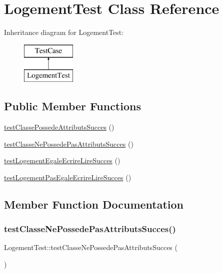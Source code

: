 \hypertarget{class_logement_test}{}\section{Logement\+Test Class Reference}
\label{class_logement_test}
Inheritance diagram for Logement\+Test\+:\begin{figure}[H]
\begin{center}
\leavevmode
\includegraphics[height=2.000000cm]{class_logement_test}
\end{center}
\end{figure}
\subsection*{Public Member Functions}
\begin{DoxyCompactItemize}
\item 
\hyperlink{class_logement_test_acea05fbf0c7cd9753be6445eebf78bd2}{test\+Classe\+Possede\+Attributs\+Succes} ()
\item 
\hyperlink{class_logement_test_a0ce0697b45827633d55c0e295f98761b}{test\+Classe\+Ne\+Possede\+Pas\+Attributs\+Succes} ()
\item 
\hyperlink{class_logement_test_af0b1e4628835aae912f751a7a6c90004}{test\+Logement\+Egale\+Ecrire\+Lire\+Succes} ()
\item 
\hyperlink{class_logement_test_a02f0a76289821a3e8f25fe930491c6ec}{test\+Logement\+Pas\+Egale\+Ecrire\+Lire\+Succes} ()
\end{DoxyCompactItemize}


\subsection{Member Function Documentation}
\mbox{\label{class_logement_test_a0ce0697b45827633d55c0e295f98761b}} 
\subsubsection{\texorpdfstring{test\+Classe\+Ne\+Possede\+Pas\+Attributs\+Succes()}{testClasseNePossedePasAttributsSucces()}}
{\footnotesize\ttfamily Logement\+Test\+::test\+Classe\+Ne\+Possede\+Pas\+Attributs\+Succes (\begin{DoxyParamCaption}{ }\end{DoxyParamCaption})}

